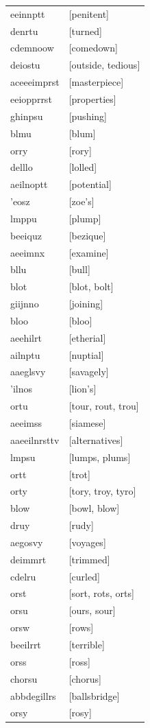 \documentclass{article}
\begin{document}
\begin{tabular}{ll}
eeinnptt & [penitent] \\
denrtu & [turned] \\
cdemnoow & [comedown] \\
deiostu & [outside, tedious] \\
aceeeimprst & [masterpiece] \\
eeiopprrst & [properties] \\
ghinpsu & [pushing] \\
blmu & [blum] \\
orry & [rory] \\
delllo & [lolled] \\
aeilnoptt & [potential] \\
'eosz & [zoe's] \\
lmppu & [plump] \\
beeiquz & [bezique] \\
aeeimnx & [examine] \\
bllu & [bull] \\
blot & [blot, bolt] \\
giijnno & [joining] \\
bloo & [bloo] \\
aeehilrt & [etherial] \\
ailnptu & [nuptial] \\
aaeglsvy & [savagely] \\
'ilnos & [lion's] \\
ortu & [tour, rout, trou] \\
aeeimss & [siamese] \\
aaeeilnrsttv & [alternatives] \\
lmpsu & [lumps, plums] \\
ortt & [trot] \\
orty & [tory, troy, tyro] \\
blow & [bowl, blow] \\
druy & [rudy] \\
aegosvy & [voyages] \\
deimmrt & [trimmed] \\
cdelru & [curled] \\
orst & [sort, rots, orts] \\
orsu & [ours, sour] \\
orsw & [rows] \\
beeilrrt & [terrible] \\
orss & [ross] \\
chorsu & [chorus] \\
abbdegillrs & [ballsbridge] \\
orsy & [rosy] \\

\end{tabular}
\end{document}
